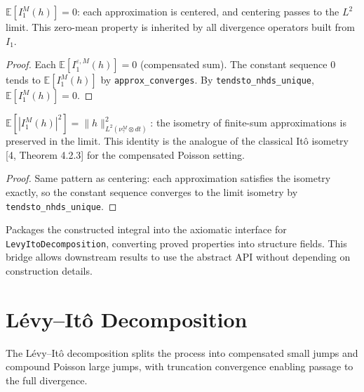 \begin{theorem}\label{thm:I1_centered}
\leanok
{}
$\mathbb{E}[I_1^M(h)] = 0$: each approximation is centered,
and centering passes to the $L^2$ limit.
This zero-mean property is inherited by all divergence operators built from $I_1$.
\end{theorem}
\begin{proof}\leanok
Each $\mathbb{E}[I_1^{\varepsilon,M}(h)] = 0$ (compensated sum). The constant
sequence $0$ tends to $\mathbb{E}[I_1^M(h)]$ by \texttt{approx\_converges}.
By \texttt{tendsto\_nhds\_unique}, $\mathbb{E}[I_1^M(h)] = 0$.
\end{proof}

\begin{theorem}\label{thm:I1_isometry}
\leanok
{}
$\mathbb{E}[|I_1^M(h)|^2] = \|h\|_{L^2(\nu_\gamma^M \otimes dt)}^2$:
the isometry of finite-sum approximations is preserved in the limit.
This identity is the analogue of the classical It\^o isometry [4, Theorem 4.2.3] for the compensated Poisson setting.
\end{theorem}
\begin{proof}\leanok Same pattern as centering: each approximation satisfies the isometry exactly,
so the constant sequence converges to the limit isometry by \texttt{tendsto\_nhds\_unique}.\end{proof}

\begin{defn}\label{def:toAxioms}
\leanok
{}
Packages the constructed integral into the axiomatic interface for
\texttt{LevyItoDecomposition}, converting proved properties into structure fields.
This bridge allows downstream results to use the abstract API without depending on construction details.
\end{defn}

\section{Lévy--Itô Decomposition}

The L\'evy--It\^o decomposition splits the process into compensated small jumps and compound Poisson large jumps, with truncation convergence enabling passage to the full divergence.

